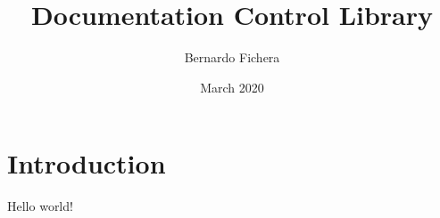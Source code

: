 \documentclass[12pt]{article}
\title{Documentation Control Library}
\author{Bernardo Fichera}
\date{March 2020}
\begin{document}
\maketitle

\section*{Introduction}

Hello world!
\end{document}
